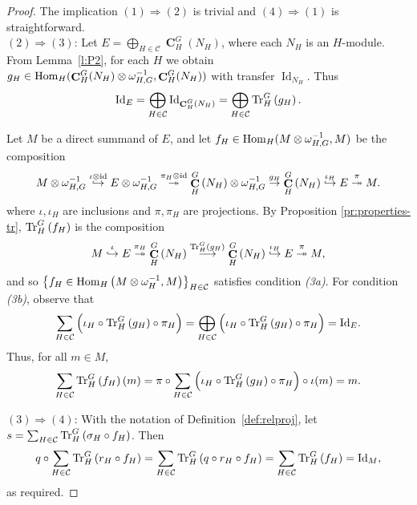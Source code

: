 \documentclass[12pt]{amsart}
\theoremstyle{definition}
\DeclareMathOperator{\coind}{\mathbf{C}}
\DeclareMathOperator{\ide}{Id}
\begin{document}
\begin{proof}
The implication $(1)\Rightarrow (2)$ is trivial and $(4)\Rightarrow (1)$ is straightforward.\\
$(2)\Rightarrow (3)$: Let $E=\bigoplus_{H\in \mathcal{C}} \coind_H^G(N_H)$, where each $N_H $ is an $H$-module. 
From Lemma~\ref{l:P2}, for each $H$ we obtain  $g_H\in {\rm Hom}_H(\coind_H^G(N_H )\otimes\omega_{H,G}^{-1}, \coind_H^G(N_H))$ with transfer $\ide_{N_H}$.
 Thus
\[
{\rm Id}_E
=\bigoplus_{H\in\mathcal{C}}{\rm Id}_{ \coind_H^G\left(N_H\right)}
=\bigoplus_{H\in\mathcal{C}}{\rm Tr}_{H}^G\left(g_H\right).
\]

Let $M$ be a direct summand of $E$, and let $f_H\in{\rm Hom}_H(M\otimes \omega_{H,G}^{-1},M)$ be the composition
\[
M\otimes\omega_{H,G}^{-1}\overset{\iota\otimes{\rm id}}{\hookrightarrow}
E\otimes\omega_{H,G}^{-1}\overset{\pi_H\otimes {\rm id}}{\twoheadrightarrow}
\coind_H^G\left(N_H\right)\otimes\omega_{H,G}^{-1}\overset{g_H}{\rightarrow}
\coind_H^G\left(N_H\right)\overset{\iota_H}{\hookrightarrow}
E\overset{\pi}{\twoheadrightarrow}
M.
\]
where $\iota,\iota_H$ are inclusions and $\pi,\pi_H$ are projections.  By Proposition \ref{pr:properties-tr}, ${\rm Tr}_{H}^G\left(f_H\right)$ is the composition
 \[
M \overset{\iota}{\hookrightarrow}
E \overset{\pi_H}{\twoheadrightarrow}
\coind_H^G \left(N_H\right) \overset{{\rm Tr}_{H}^G\left(g_H\right)}{\longrightarrow}
\coind_H^G \left(N_H\right)\overset{\iota_H}{\hookrightarrow}
E\overset{\pi}{\twoheadrightarrow}
M,
\]
and so $\left\{f_H\in{\rm Hom}_H\left(M\otimes\omega_H^{-1},M\right)\right\}_{H\in\mathcal{C}}$ satisfies condition {\em (3a)}. For condition {\em (3b)}, observe that
\[
\sum_{H\in\mathcal{C}}\left(\iota_H\circ{\rm Tr}_{H}^G\left(g_H\right)\circ\pi_H\right)=
\bigoplus_{H\in\mathcal{C}}\left(\iota_H\circ{\rm Tr}_{H}^G\left(g_H\right)\circ\pi_H\right)=
{\rm Id}_{E}.
\]
Thus, for all $m\in M$,
\[
\sum_{H\in\mathcal{C}}{\rm Tr}_{H}^G\left(f_H\right)(m)
=\pi\circ\sum_{H\in\mathcal{C}}\left(\iota_H\circ{\rm Tr}_{H}^G\left(g_H\right)\circ\pi_H\right)\circ \iota (m)
=m.
\]


$(3)\Rightarrow (4)$: With the notation of Definition~\ref{def:relproj}, let $s=\sum_{H\in\mathcal{C}}{\rm Tr}_{H}^G\left(\sigma_H\circ f_H\right)$. Then
\[
q\circ\sum_{H\in\mathcal{C}}{\rm Tr}_{H}^G\left(r_H\circ f_H\right)=
\sum_{H\in\mathcal{C}}{\rm Tr}_{H}^G \left( q \circ r_H \circ f_H \right)=
\sum_{H\in\mathcal{C}}{\rm Tr}_{H}^G\left(f_H\right)={\rm Id}_{M},
\]
as required.
\end{proof}
\end{document}

